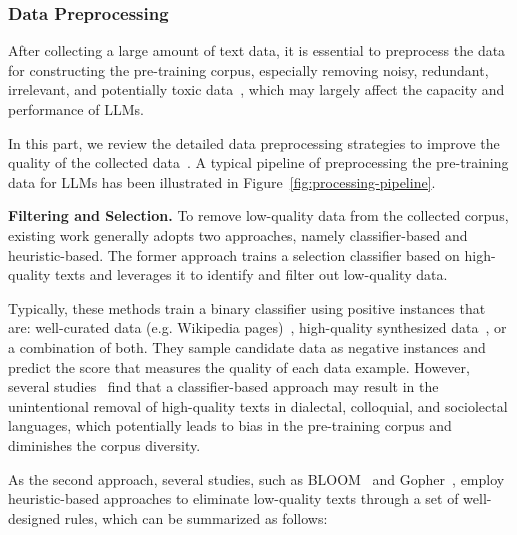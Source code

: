 \subsubsection{Data Preprocessing}
\label{sec:data_pre_processing}
After collecting a large amount of text data, it is essential to preprocess the data for constructing  the pre-training corpus, especially removing  noisy, redundant, irrelevant, and potentially toxic data~\cite{Rae-arxiv-2021-Scaling, Chowdhery-arxiv-2022-PaLM, Longpre-arxiv-2023-pretrainer}, which may largely affect the  capacity and performance of LLMs.  

In this part, we review the detailed data preprocessing strategies to improve the quality of the collected data~\cite{Rae-arxiv-2021-Scaling,Du-ICML-2022-GLaM,Scao-arxiv-2022-BLOOM}. {A typical pipeline of preprocessing the pre-training data for LLMs has been illustrated in Figure~\ref{fig:processing-pipeline}.}

\textbf{Filtering and Selection.} To remove low-quality data from the collected corpus, existing work generally adopts two approaches, namely  classifier-based and heuristic-based. The former approach trains a selection classifier based on high-quality texts and leverages it to identify and filter out low-quality data. 

{Typically, these methods train a binary classifier using positive instances that are: well-curated data (e.g. Wikipedia pages)~\cite{Brown-NeurIPS-2020-Language,Du-ICML-2022-GLaM,Chowdhery-arxiv-2022-PaLM},   high-quality synthesized data~\cite{LLaMa3,Abdin-arxiv-2024-phi3,Penedo-arxiv-2024-fineweb,Maini-ICLRworkshop-2024-rephrasing}, or a combination of both.} They sample candidate data as negative instances and predict the score that measures the quality of each data example. However, several studies~\cite{Du-ICML-2022-GLaM, Rae-arxiv-2021-Scaling} find that a classifier-based approach may result in the unintentional removal of high-quality texts in dialectal, colloquial, and sociolectal languages, which potentially leads to bias in the pre-training corpus and diminishes the corpus diversity.

As the second approach, several studies, such as BLOOM~\cite{Scao-arxiv-2022-BLOOM} and Gopher~\cite{Rae-arxiv-2021-Scaling}, employ heuristic-based approaches to eliminate low-quality texts through a set of well-designed rules, which can be summarized as follows:

